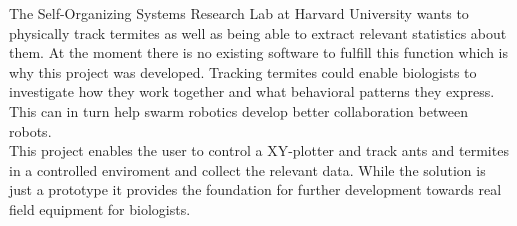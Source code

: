 


The Self-Organizing Systems Research Lab at Harvard University wants to physically track termites as well as being able to extract relevant statistics about them. At the moment there is no existing software to fulfill this function which is why this project was developed. Tracking termites could enable biologists to investigate how they work together and what behavioral patterns they express. This can in turn help swarm robotics develop better collaboration between robots. \\

This project enables the user to control a XY-plotter and track ants and termites in a controlled enviroment and collect the relevant data. While the solution is just a prototype it provides the foundation for further development towards real field equipment for biologists. 